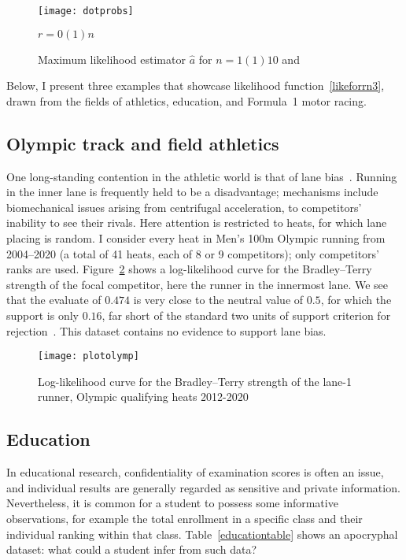 \documentclass[article]{ajs}
\begin{document}
\begin{figure}[t]
  \begin{centering}
\texttt{[image: dotprobs]}  %
\caption{Maximum likelihood estimator $\hat{a}$ for $n=1(1)10$
  and\label{dotprobs}} $r=0(1)n$
\end{centering}
\end{figure}


Below, I present three examples that showcase likelihood
function~\ref{likeforrn3}, drawn from the fields of athletics,
education, and Formula~1 motor racing.

\subsection{Olympic track and field athletics}

One long-standing contention in the athletic world is that of lane
bias~\citep{munro2022}.  Running in the inner lane is frequently held
to be a disadvantage; mechanisms include biomechanical issues arising
from centrifugal acceleration, to competitors' inability to see their
rivals.  Here attention is restricted to heats, for which lane placing
is random.  I consider every heat in Men's 100m Olympic running from
2004--2020 (a total of 41 heats, each of 8 or 9 competitors); only
competitors' ranks are used.  Figure~\ref{plotolymp} shows a
log-likelihood curve for the Bradley--Terry strength of the focal
competitor, here the runner in the innermost lane.  We see that the
evaluate of $0.474$ is very close to the neutral value of $0.5$, for
which the support is only $0.16$, far short of the standard two units
of support criterion for rejection~\citep{edwards1972}.  This dataset
contains no evidence to support lane bias.

\begin{figure}[t]
  \begin{centering}
\texttt{[image: plotolymp]} %
\caption{Log-likelihood curve for the Bradley--Terry strength of the
  lane-1 runner, Olympic qualifying heats 2012-2020 \label{plotolymp}}
\end{centering}
\end{figure}

\subsection{Education}

In educational research, confidentiality of examination scores is
often an issue, and individual results are generally regarded as
sensitive and private information.  Nevertheless, it is common for a
student to possess some informative observations, for example the
total enrollment in a specific class and their individual ranking
within that class.  Table~\ref{educationtable} shows an apocryphal
dataset: what could a student infer from such data?
\end{document}
